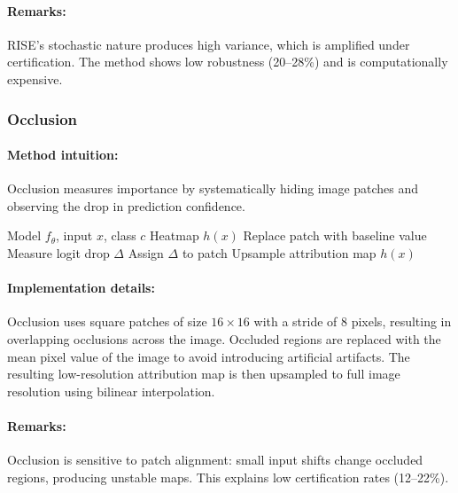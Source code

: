 \documentclass[11pt]{article}
\begin{document}
\paragraph{Remarks:}
RISE's stochastic nature produces high variance, which is amplified under certification. The method shows low robustness (20--28\%) and is computationally expensive.

\subsubsection{Occlusion}

\paragraph{Method intuition:}
Occlusion measures importance by systematically hiding image patches and observing the drop in prediction confidence.

\begin{algorithm}[H]
\caption{Occlusion}
\label{alg:occlusion}
\begin{algorithmic}[1]
\REQUIRE Model $f_\theta$, input $x$, class $c$
\ENSURE Heatmap $h(x)$
    \STATE Replace patch with baseline value
    \STATE Measure logit drop $\Delta$
    \STATE Assign $\Delta$ to patch
\ENDFOR
\STATE Upsample attribution map
\RETURN $h(x)$
\end{algorithmic}
\end{algorithm}

\paragraph{Implementation details:}
Occlusion uses square patches of size $16 \times 16$ with a stride of 8 pixels, resulting in overlapping occlusions across the image. Occluded regions are replaced with the mean pixel value of the image to avoid introducing artificial artifacts. The resulting low-resolution attribution map is then upsampled to full image resolution using bilinear interpolation.

\paragraph{Remarks:}
Occlusion is sensitive to patch alignment: small input shifts change occluded regions, producing unstable maps. This explains low certification rates (12--22\%).
\end{document}

